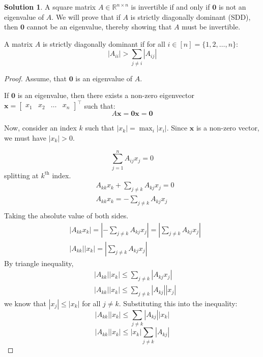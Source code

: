 \documentclass{amsart}[11pt]
\theoremstyle{definition}
\newtheorem*{solution}{Solution}
\begin{document}
\begin{solution}
    A square matrix $A \in \mathbb{R}^{n \times n}$ is invertible if and only if $\mathbf{0}$ is not an eigenvalue of $A$. We will prove that if $A$ is strictly diagonally dominant (SDD), then $\mathbf{0}$ cannot be an eigenvalue, thereby showing that $A$ must be invertible.

    A matrix $A$ is strictly diagonally dominant if for all $i \in [n] = \{1, 2, \dots, n\}$:
    \[
        |A_{ii}| > \sum_{j \neq i} |A_{ij}|
    \]

    \begin{proof}
        Assume, that $\mathbf{0}$ is an eigenvalue of $A$.

        If $\mathbf{0}$ is an eigenvalue, then there exists a non-zero eigenvector $\mathbf{x} = \begin{bmatrix}
            x_1&x_2&\dots&x_n
        \end{bmatrix}^\top$ such that:
        \[
            A\mathbf{x} = \mathbf{0}\mathbf{x} = \mathbf{0}
        \]

        Now, consider an index $k$ such that $|x_k| = \max_{i} |x_i|$. Since $\mathbf{x}$ is a non-zero vector, we must have $|x_k| > 0$.

        \[
            \sum_{j=1}^{n} A_{ij} x_j = 0
        \]
        splitting at $k^{\text{th}}$ index.
        \begin{align*}
            &A_{kk} x_k + \sum_{j \neq k} A_{kj} x_j = 0\\
            &A_{kk} x_k = - \sum_{j \neq k} A_{kj} x_j\\
        \end{align*}
        Taking the absolute value of both sides.
        \begin{align*}
            &|A_{kk} x_k| = \left| - \sum_{j \neq k} A_{kj} x_j \right| = \left| \sum_{j \neq k} A_{kj} x_j \right|\\
            &|A_{kk}| |x_k| = \left| \sum_{j \neq k} A_{kj} x_j \right|
        \end{align*}
        By triangle inequality,
        \begin{align*}
            &|A_{kk}| |x_k| \leq \sum_{j \neq k} |A_{kj} x_j|\\
            &|A_{kk}| |x_k| \leq \sum_{j \neq k} |A_{kj}| |x_j|
        \end{align*}
        we know that $|x_j| \leq |x_k|$ for all $j \neq k$. Substituting this into the inequality:
        $$|A_{kk}| |x_k| \leq \sum_{j \neq k} |A_{kj}| |x_k|$$
        $$|A_{kk}| |x_k| \leq |x_k| \sum_{j \neq k} |A_{kj}|$$


\end{proof}
\end{solution}
\end{document}
